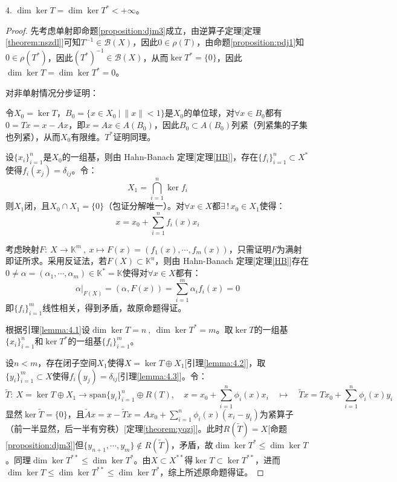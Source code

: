 \begin{proposition}
4. $\dim\ker T=\dim\ker T^*<+\infty$。
\end{proposition}
\begin{proof}
先考虑单射即命题\ref{proposition:djm3}成立，由逆算子定理[定理\ref{theorem:nszdl}]可知$T^{-1} \in \mathscr{B}(X)$，因此$0 \in \rho(T)$，由命题\ref{proposition:pdj1}知$0 \in \rho(T^*)$，因此$(T^*)^{-1} \in \mathscr{B}(X)$，从而$\ker T^*=\{0\}$，因此$\dim\ker T=\dim\ker T^*=0$。

对非单射情况分步证明：
\begin{lemma}\label{lemma:4.1}
令$X_0=\ker T$，$B_0=\{x \in X_0 \ | \ \|x\|<1\}$是$X_0$的单位球，对$\forall x \in B_0$都有$0=Tx=x-Ax$，即$x=Ax \in A(B_0)$，因此$B_0 \subset A(B_0)$列紧（列紧集的子集也列紧），从而$X_0$有限维。$T^*$证明同理。
\end{lemma}

\begin{lemma}[若有限维子空间$X_0 \subset X$则存在闭子空间$X_1 \subset X$使得$X=X_0 \oplus X_1$]\label{lemma:4.2}
设$\{x_i\}_{i=1}^n$是$X_0$的一组基，则由 Hahn-Banach 定理[定理\ref{HB}]，存在$\{f_i\}_{i=1}^n \subset X^*$使得$f_i(x_j)=\delta_{ij}$。令：
\[X_1=\bigcap_{i=1}^n\ker f_i\]
则$X_1$闭，且$X_0 \cap X_1=\{0\}$（包证分解唯一）。对$\forall x \in X$都$\exists \, ! \, x_0 \in X_1$使得：
\[x=x_0+\sum_{i=1}^nf_i(x)x_i\]
\end{lemma}

\begin{lemma}[设$\{f_i\}_{i=1}^m \subset X^*$是线性无关集，则$\exists \, \{y_i\}_{i=1}^m \subset X$使得$f_i(y_j)=\delta_{ij}$]\label{lemma:4.3}
考虑映射$F: \ X \to \mathbb{K}^m \ , \ x \mapsto F(x)=(f_1(x),\cdots,f_m(x))$，只需证明$F$为满射即证所求。采用反证法，若$F(X) \subset \mathbb{K}^n$，则由 Hahn-Banach 定理[定理\ref{HB}]存在$0 \neq \alpha=(\alpha_1,\cdots,\alpha_m)\in\mathbb{K}^*=\mathbb{K}$使得对$\forall x \in X$都有：
\[\alpha|_{F(X)}=(\alpha,F(x))=\sum_{i=1}^m\alpha_if_i(x)=0\]
即$\{f_i\}_{i=1}^m$线性相关，得到矛盾，故原命题得证。
\end{lemma}

根据引理\ref{lemma:4.1}设$\dim\ker T=n \ , \ \dim\ker T^*=m$。取$\ker T$的一组基$\{x_i\}_{i=1}^n$和$\ker T^*$的一组基$\{f_i\}_{i=1}^m$。

设$n<m$，存在闭子空间$X_1$使得$X=\ker T \oplus X_1$[引理\ref{lemma:4.2}]，取$\{y_i\}_{i=1}^m \subset X$使得$f_i(y_j)=\delta_{ij}$[引理\ref{lemma:4.3}]。令：
$$\widetilde{T}: \ X=\ker T \oplus X_1 \to \text{span}\{y_i\}_{i=1}^n \oplus R(T), \quad x=x_0+\sum_{i=1}^n\phi_i(x)x_i \quad \mapsto \quad \widetilde{T}x=Tx_0+\sum_{i=1}^n\phi_i(x)y_i$$
显然$\ker\widetilde{T}=\{0\}$，且$\widetilde{A}x=x-\widetilde{T}x=Ax_0+\sum_{i=1}^n\phi_i(x)(x_i-y_i)$为紧算子（前一半显然，后一半有穷秩）[定理\ref{theorem:yqzj}]。此时$R(\widetilde{T})=X$[命题\ref{proposition:djm3}]但$\{y_{n+1},\cdots,y_m\} \notin R(\widetilde{T})$，矛盾，故$\dim\ker T^* \leq \dim\ker T$。同理$\dim\ker T^{**} \leq \dim\ker T^*$。由$X \subset X^{**}$得$\ker T \subset \ker T^{**}$，进而$\dim\ker T \leq \dim\ker T^{**} \leq \dim\ker T^*$，综上所述原命题得证。
\end{proof}
